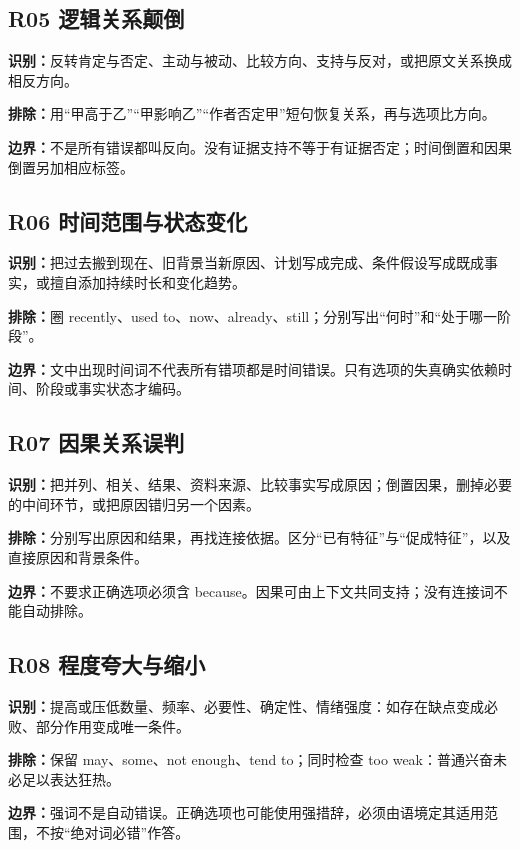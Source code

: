 \documentclass[11pt,a4paper]{article}
\begin{document}
\subsection{R05 逻辑关系颠倒}\label{cat-R05}
\noindent\textbf{识别：}反转肯定与否定、主动与被动、比较方向、支持与反对，或把原文关系换成相反方向。\par
\noindent\textbf{排除：}用“甲高于乙”“甲影响乙”“作者否定甲”短句恢复关系，再与选项比方向。\par
\noindent\textbf{边界：}不是所有错误都叫反向。没有证据支持不等于有证据否定；时间倒置和因果倒置另加相应标签。\par
{}
\subsection{R06 时间范围与状态变化}\label{cat-R06}
\noindent\textbf{识别：}把过去搬到现在、旧背景当新原因、计划写成完成、条件假设写成既成事实，或擅自添加持续时长和变化趋势。\par
\noindent\textbf{排除：}圈 recently、used to、now、already、still；分别写出“何时”和“处于哪一阶段”。\par
\noindent\textbf{边界：}文中出现时间词不代表所有错项都是时间错误。只有选项的失真确实依赖时间、阶段或事实状态才编码。\par
{}
\subsection{R07 因果关系误判}\label{cat-R07}
\noindent\textbf{识别：}把并列、相关、结果、资料来源、比较事实写成原因；倒置因果，删掉必要的中间环节，或把原因错归另一个因素。\par
\noindent\textbf{排除：}分别写出原因和结果，再找连接依据。区分“已有特征”与“促成特征”，以及直接原因和背景条件。\par
\noindent\textbf{边界：}不要求正确选项必须含 because。因果可由上下文共同支持；没有连接词不能自动排除。\par
{}
\subsection{R08 程度夸大与缩小}\label{cat-R08}
\noindent\textbf{识别：}提高或压低数量、频率、必要性、确定性、情绪强度：如存在缺点变成必败、部分作用变成唯一条件。\par
\noindent\textbf{排除：}保留 may、some、not enough、tend to；同时检查 too weak：普通兴奋未必足以表达狂热。\par
\noindent\textbf{边界：}强词不是自动错误。正确选项也可能使用强措辞，必须由语境定其适用范围，不按“绝对词必错”作答。\par
{}
\end{document}
